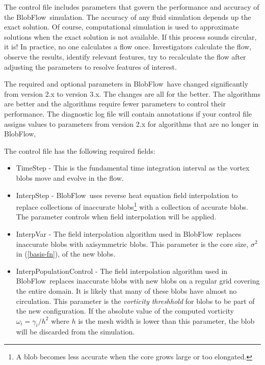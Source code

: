 \documentclass[12pt]{report}
\newcommand{\eqnn}[1]{(\ref{#1})}
\newcommand{\BF}{BlobFlow}
\begin{document}
The control file includes parameters that govern the performance and
accuracy of the \BF~simulation.  The
accuracy of any fluid simulation depends up the exact solution.  Of course,
computational simulation is used to approximate solutions when the exact
solution is not available.  If this
process sounds circular, it is!  In practice, no one calculates a flow
once.  Investigators calculate the flow, observe the results, identify
relevant features, try to recalculate the flow after adjusting the parameters to
resolve features of interest.  

The required and optional parameters in \BF~have changed significantly from
version 2.x to version 3.x.  The changes are all for the better.  The algorithms
are better and the algorithms require fewer parameters to control their
performance.  The diagnostic log file will contain annotations if your control
file assigns values to parameters from version 2.x for algorithms that are no
longer in \BF,

The control file has the following required fields:
\begin{itemize}

\item TimeStep - This is the fundamental time integration interval as the
vortex blobs move and evolve in the flow.

\item InterpStep - \BF~uses reverse heat equation field interpolation to replace
collections of inaccurate blobs\footnote{A blob becomes less accurate when the
core grows large or too elongated.} with a collection of accurate
blobs\cite{barba-rossi}.  The parameter controls when field interpolation will
be applied.

\item InterpVar - The field interpolation algorithm used in \BF~replaces
inaccurate blobs with axisymmetric blobs.  This parameter is the core size,
$\sigma^2$ in \eqnn{basis-fn}, of the new blobs.

\item InterpPopulationControl - The field interpolation algorithm used in
\BF~replaces inaccurate blobs with new blobs on a regular grid covering the
entire domain.  It is likely that many of these blobs have almost no
circulation.  This parameter is the {\em vorticity threshhold} for blobs to be
part of the new configuration.  If the absolute value of the computed vorticity
$\omega_i=\gamma_i/h^2$ where $h$ is the mesh width is lower than this
parameter, the blob will be discarded from the simulation.

\end{itemize}
\end{document}
